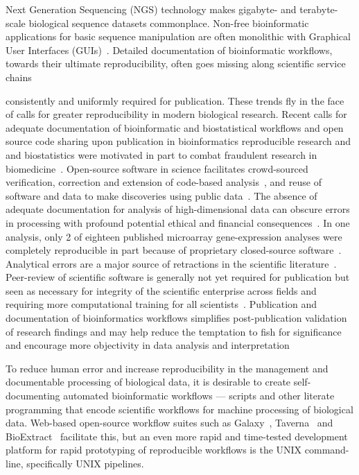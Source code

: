 \documentclass{frontiersSCNS} %
\begin{document}
Next Generation Sequencing (NGS) technology makes gigabyte- and
terabyte-scale biological sequence datasets commonplace.  Non-free
bioinformatic applications for basic sequence manipulation are often
monolithic with Graphical User Interfaces (GUIs)~\citep{Smith1994,
  Rampp2006, Librado01062009}.  Detailed documentation of
bioinformatic workflows, towards their ultimate reproducibility, often goes missing along scientific service chains

consistently and uniformly required for
publication. These trends fly in the face of calls for greater
reproducibility in modern biological research. Recent calls for
adequate documentation of bioinformatic and biostatistical workflows
and open source code sharing upon publication in bioinformatics
reproducible research and and biostatistics were motivated in part to
combat fraudulent research in
biomedicine~\citep{Peng01072009}. Open-source software in science
facilitates crowd-sourced verification, correction and extension of
code-based analysis~\citep{barnes2010publish}, and reuse of software
and data to make discoveries using public
data~\citep{Peng02122011}. The absence of adequate documentation for
analysis of high-dimensional data can obscure errors in processing
with profound potential ethical and financial
consequences~\citep{BaggerlyCoombes2009,hutson2010data,Baggerly01052011,Huang01072013}. In
one analysis, only 2 of eighteen published microarray gene-expression
analyses were completely reproducible in part because of proprietary
closed-source software~\citep{Ioannidis:2008cr}. Analytical errors are
a major source of retractions in the scientific
literature~\citep{Casadevall01092014}. Peer-review of scientific
software is generally not yet required for publication but seen as
necessary for integrity of the scientific enterprise across fields and
requiring more computational training for all
scientists~\citep{Morin13042012,Joppa17052013}. Publication and
documentation of bioinformatics workflows simplifies post-publication
validation of research findings and may help reduce the temptation to
fish for significance and encourage more objectivity in data analysis
and interpretation~\citep{Boulesteix01022010}

To reduce human error and increase reproducibility in the management
and documentable processing of biological data, it is desirable to
create self-documenting automated bioinformatic workflows --- scripts
and other literate programming that encode scientific workflows for
machine processing of biological data. Web-based open-source workflow
suites such as Galaxy~\citep{galaxy14}, Taverna~\citep{CPE:CPE993} and
BioExtract~\citep{Lushbough01072011} facilitate this, but an even more
rapid and time-tested development platform for rapid prototyping of reproducible
workflows is the UNIX command-line, specifically UNIX pipelines.
\end{document}
